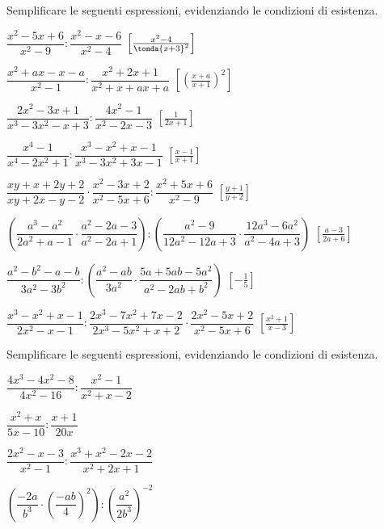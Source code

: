 \begin{esercizio}[\Ast]
\label{ese:19.19}
Semplificare le seguenti espressioni, evidenziando le condizioni di esistenza.
\begin{enumeratea}
 \item \(\dfrac{x^{2}-5x+6}{x^{2}-9}:\dfrac{x^{2}-x-6}{x^{2}-4}\)
  \hfill \(\left[\frac{x^2-4}{\tonda{x+3}^2}\right]\)
 \item \(\dfrac{x^{2}+ax-x-a}{x^{2}-1}:\dfrac{x^{2}+2x+1}{x^{2}+x+ax+a}\)
  \hfill \(\left[\left(\frac{x+a}{x+1}\right)^{2}\right]\)
 \item \(\dfrac{2x^{2}-3x+1}{x^{3}-3x^{2}-x+3}:\dfrac{4x^{2}-1}{x^{2}-2x-3}\)
  \hfill \(\left[\frac{1}{2x+1}\right]\)
 \item \(\dfrac{x^{4}-1}{x^{4}-2x^{2}+1}:
        \dfrac{x^{3}-x^{2}+x-1}{x^{3}-3x^{2}+3x-1}\)
  \hfill \(\left[\frac{x-1}{x+1}\right]\)
 \item \(\dfrac{xy+x+2y+2}{xy+2x-y-2}\cdot
 \dfrac{x^{2}-3x+2}{x^{2}-5x+6}:\dfrac{x^{2}+5x+6}{x^{2}-9}\)
  \hfill \(\left[\frac{y+1}{y+2}\right]\)
 \item \(\left(\dfrac{a^{3}-a^{2}}{2a^{2}+a-1}\cdot
 \dfrac{a^{2}-2a-3}{a^{2}-2a+1}\right):
 \left(\dfrac{a^{2}-9}{12a^{2}-12a+3}\cdot
 \dfrac{12a^{3}-6a^{2}}{a^{2}-4a+3}\right)\)
  \hfill \(\left[\frac{a-3}{2a+6}\right]\)
 \item \(\dfrac{a^{2}-b^{2}-a-b}{3a^{2}-3b^{2}}:
 \left(\dfrac{a^{2}-ab}{3a^{2}}\cdot
 \dfrac{5a+5ab-5a^{2}}{a^{2}-2ab+b^{2}}\right)\)
  \hfill \(\left[-{\frac{1}{5}}\right]\)
 \item \(\dfrac{x^{3}-x^{2}+x-1}{2x^{2}-x-1}:
 \dfrac{2x^{3}-7x^{2}+7x-2}{2x^{3}-5x^{2}+x+2}\cdot
 \dfrac{2x^{2}-5x+2}{x^{2}-5x+6}\)
  \hfill \(\left[\frac{x^{2}+1}{x-3}\right]\)
\end{enumeratea}
\end{esercizio}

\begin{esercizio}
\label{ese:19.21}
Semplificare le seguenti espressioni, evidenziando le condizioni di esistenza.
\begin{multicols}{2}
\begin{enumeratea}
 \item \(\dfrac{4x^{3}-4x^{2}-8}{4x^{2}-16}:\dfrac{x^{2}-1}{x^{2}+x-2}\)
 \item \(\dfrac{x^{2}+x}{5x-10}:\dfrac{x+1}{20x}\)
 \item \(\dfrac{2x^{2}-x-3}{x^{2}-1}:\dfrac{x^{3}+x^{2}-2x-2}{x^{2}+2x+1}\)
 \item \(\left(\dfrac{-{2a}}{b^{3}}\cdot
        \left(\dfrac{-{ab}}{4}\right)^{2}\right):
        \left(\dfrac{a^{2}}{2b^{3}}\right)^{-2}\)%
\end{enumeratea}
\end{multicols}
\end{esercizio}

